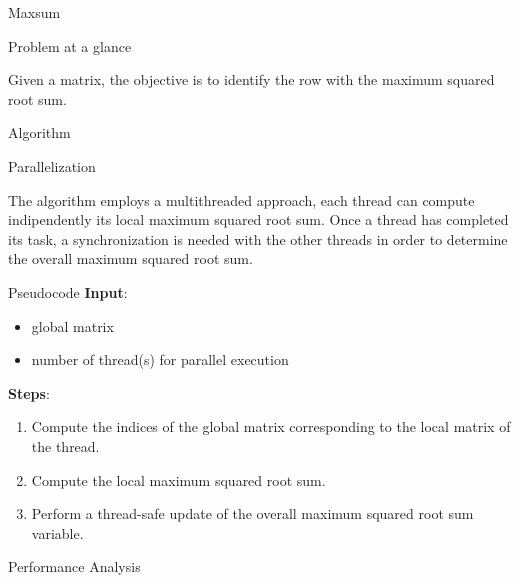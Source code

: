 \begin{chapter}{Maxsum}
    \begin{section}{Problem at a glance}
        \par Given a matrix, the objective is to identify the row with the maximum squared root sum.
    \end{section}
    \begin{section}{Algorithm}
        \begin{subsection}{Parallelization}
            \par The algorithm employs a multithreaded approach, each thread can compute indipendently its local maximum squared root sum. Once a thread has completed its task, a synchronization is needed with the other threads in order to determine the overall maximum squared root sum.
        \end{subsection}
        \begin{subsection}{Pseudocode}
            \textbf{Input}:
            \begin{itemize}
                \item global matrix
                \item number of thread(s) for parallel execution
            \end{itemize}
            \textbf{Steps}:
            \begin{enumerate}
                \item Compute the indices of the global matrix corresponding to the local matrix of the thread.
                \item Compute the local maximum squared root sum.
                \item Perform a thread-safe update of the overall maximum squared root sum variable.
            \end{enumerate}
            
        \end{subsection}
        \clearpage
        \begin{subsection}{Performance Analysis}
            \begin{figure}[ht]
                \centering
                
                \label{fig:maxsum-exectime}
            \end{figure}
            \begin{figure}[ht]
                \centering
                
                \label{fig:maxsum-speedup}
            \end{figure}
            \begin{figure}[ht]
                \centering
                
                \label{fig:maxsum-efficiency}
            \end{figure}
        \end{subsection}
    \end{section}
\end{chapter}